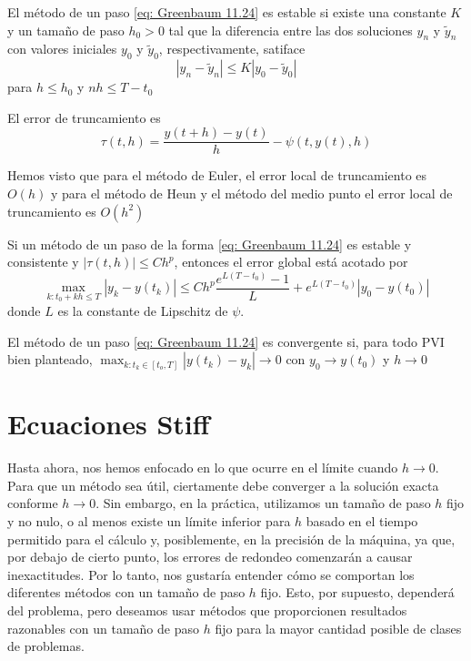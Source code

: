\begin{definition}
    El método de un paso \ref{eq: Greenbaum 11.24} es estable si existe una constante $K$ y un tamaño de paso $h_0 > 0$ tal que la diferencia entre las dos soluciones $y_n$ y $\tilde{y}_n$ con valores iniciales $y_0$ y $\tilde{y}_0$, respectivamente, satiface
    \[ |y_n - \tilde{y}_n| \leq K |y_0 - \tilde{y}_0| \]
    para $h \leq h_0$ y $nh \leq T - t_0$
\end{definition}

\begin{definition}
    El error de truncamiento es 
    \[ \tau(t, h) = \frac{y(t + h) - y(t)}{h} - \psi(t, y(t), h) \]
\end{definition}

Hemos visto que para el método de Euler, el error local de truncamiento es $O(h)$ y para el método de Heun y el método del medio punto el error local de truncamiento es $O(h^2)$

\begin{theorem}
    Si un método de un paso de la forma \ref{eq: Greenbaum 11.24} es estable y consistente y $|\tau(t, h)| \leq Ch^p$, entonces el error global está acotado por 
    \[ \max_{k: t_0 + kh \leq T} |y_k - y(t_k)| \leq Ch^p \frac{e^{L(T - t_0)} - 1}{L} + e^{L(T - t_0)} |y_0 - y(t_0)|\]
    donde $L$ es la constante de Lipschitz de $\psi$.
\end{theorem}

\begin{definition}
    El método de un paso \ref{eq: Greenbaum 11.24} es convergente si, para todo PVI bien planteado, $\max_{k: t_k \in [t_o, T]} |y(t_k) - y_k| \rightarrow 0$ con $y_0 \rightarrow y(t_0)$ y $h \rightarrow 0$
\end{definition}

\section{Ecuaciones Stiff}
Hasta ahora, nos hemos enfocado en lo que ocurre en el límite cuando \( h \to 0 \). Para que un método sea útil, ciertamente debe converger a la solución exacta conforme \( h \to 0 \). Sin embargo, en la práctica, utilizamos un tamaño de paso \( h \) fijo y no nulo, o al menos existe un límite inferior para \( h \) basado en el tiempo permitido para el cálculo y, posiblemente, en la precisión de la máquina, ya que, por debajo de cierto punto, los errores de redondeo comenzarán a causar inexactitudes. Por lo tanto, nos gustaría entender cómo se comportan los diferentes métodos con un tamaño de paso \( h \) fijo. Esto, por supuesto, dependerá del problema, pero deseamos usar métodos que proporcionen resultados razonables con un tamaño de paso \( h \) fijo para la mayor cantidad posible de clases de problemas.


